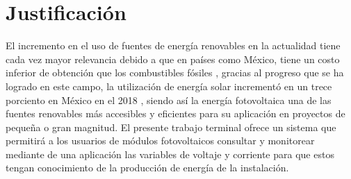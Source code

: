 \section{Justificación}
El incremento en el uso de fuentes de energía renovables en la actualidad tiene cada vez mayor relevancia debido a que en países como México, tiene un costo inferior de obtención que los combustibles fósiles \citep{Not1}, gracias al progreso que se ha logrado en este campo, la utilización de energía solar incrementó en un trece porciento en México en el 2018 \citep{Not2}, siendo así la energía fotovoltaica una de las fuentes renovables más accesibles y eficientes para su aplicación en proyectos de pequeña o gran magnitud.
El presente trabajo terminal ofrece un sistema que permitirá a los usuarios de módulos fotovoltaicos consultar y monitorear mediante de una aplicación las variables de voltaje y corriente para que estos tengan conocimiento de la producción de energía de la instalación.
